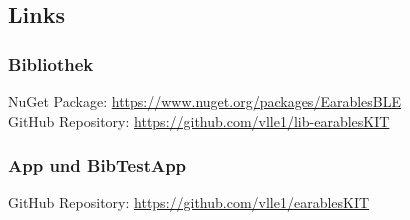 \documentclass[a4paper,12pt]{article}
\begin{document}
\subsection{Links}
\subsubsection{Bibliothek}
NuGet Package: \url{https://www.nuget.org/packages/EarablesBLE}\\
GitHub Repository: \url{https://github.com/vlle1/lib-earablesKIT}
\subsubsection{App und BibTestApp}
GitHub Repository: \url{https://github.com/vlle1/earablesKIT}


\printglossaries
{}
\end{document}
